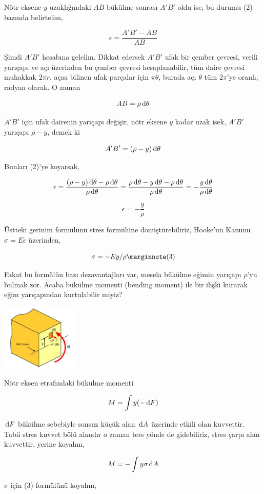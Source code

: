 \documentclass[12pt,fleqn]{article}\usepackage{../../common}
\begin{document}
Nötr eksene $y$ uzaklığındaki $AB$ bükülme sonrası $A'B'$ oldu ise, bu durumu
(2) bazında belirtelim,

$$
\epsilon = \frac{A'B' - AB}{AB}
$$

Şimdi $A'B'$ hesabına gelelim. Dikkat edersek $A'B'$ ufak bir çember çevresi,
verili yarıçapı ve açı üzerinden bu çember çevresi hesaplanabilir, tüm daire
çevresi muhakkak $2 \pi r$, açısı bilinen ufak parçalar için $\pi \theta$,
burada açı $\theta$ tüm $2 \pi$'ye oranlı, radyan olarak. O zaman

$$
AB = \rho \,\mathrm{d} \theta
$$

$A'B'$ için ufak dairenin yarıçapı değişir, nötr eksene $y$ kadar uzak isek,
$A'B'$ yarıçapı $\rho - y$, demek ki 

$$
A'B' = (\rho - y) \,\mathrm{d} \theta
$$

Bunları (2)'ye koyarsak,

$$
\epsilon = \frac{(\rho - y) \,\mathrm{d} \theta - \rho \,\mathrm{d} \theta}{\rho \,\mathrm{d}\theta} =
\frac{\rho \,\mathrm{d}\theta - y \,\mathrm{d}\theta - \rho \,\mathrm{d}\theta}{\rho \,\mathrm{d}\theta} =
- \frac{y \,\mathrm{d}\theta}{\rho \,\mathrm{d}\theta}
$$

$$
\epsilon = - \frac{y}{\rho}
$$

Üstteki gerinim formülünü stres formülüne dönüştürebiliriz, Hooke'un Kanunu
$\sigma = E \epsilon$ üzerinden,

$$
\sigma = -E y / \rho
\mlabel{3}
$$

Fakat bu formülün bazı dezavantajları var, mesela bükülme eğimin yarıçapı
$\rho$'yu bulmak zor. Acaba bükülme momenti (bending moment) ile bir ilişki
kurarak eğim yarıçapından kurtulabilir miyiz?

\includegraphics[width=10em]{phy_020_strs_00_05.jpg}

Nötr eksen etrafındaki bükülme momenti

$$
M = \int y (-\,\mathrm{d} F)
$$


$\,\mathrm{d} F$ bükülme sebebiyle sonsuz küçük alan $\,\mathrm{d} A$ üzerinde etkili olan
kuvvettir. Tabii stres kuvvet bölü alandır o zaman ters yönde de gidebiliriz,
stres çarpı alan kuvvettir, yerine koyalım,

$$
M = -\int y \sigma \,\mathrm{d} A
$$

$\sigma$ için (3) formülünü koyalım,
\end{document}

